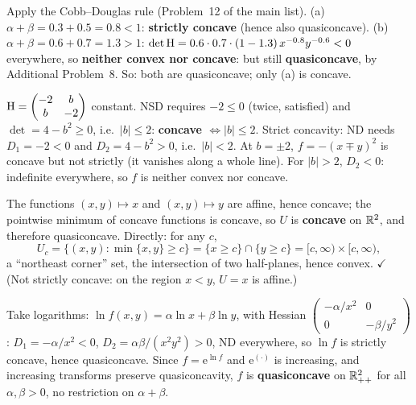 \begin{solutions}
  \item Apply the Cobb--Douglas rule (Problem~12 of the main list).
        (a) $\alpha+\beta=0.3+0.5=0.8<1$: \textbf{strictly concave}
        (hence also quasiconcave). \;
        (b) $\alpha+\beta=0.6+0.7=1.3>1$:
        $\det\operatorname{H}=0.6\cdot0.7\cdot(1-1.3)\,x^{-0.8}y^{-0.6}<0$
        everywhere, so \textbf{neither convex nor concave}: but still
        \textbf{quasiconcave}, by Additional Problem~8. So: both are
        quasiconcave; only (a) is concave.

  \item $\operatorname{H}=\begin{pmatrix}-2&b\\b&-2\end{pmatrix}$ constant. NSD
        requires $-2\le0$ (twice, satisfied) and
        $\det=4-b^{2}\ge0$, i.e.\ $|b|\le2$: \textbf{concave $\iff
        |b|\le2$}. Strict concavity: ND needs $D_1=-2<0$ and
        $D_2=4-b^{2}>0$, i.e.\ \textbf{$|b|<2$}. At $b=\pm2$,
        $f=-(x\mp y)^{2}$ is concave but not strictly (it vanishes along
        a whole line). For $|b|>2$, $D_2<0$: indefinite everywhere, so
        $f$ is neither convex nor concave.

  \item The functions $(x,y)\mapsto x$ and $(x,y)\mapsto y$ are affine,
        hence concave; the pointwise minimum of concave functions is
        concave, so $U$ is \textbf{concave} on $\mathbb{R}^{2}$, and therefore
        quasiconcave. Directly: for any $c$,
        \[
          U_c=\{(x,y): \min\{x,y\}\ge c\} = \{x\ge c\}\cap\{y\ge c\}
             = [c,\infty)\times[c,\infty),
        \]
        a ``northeast corner'' set, the intersection of two half-planes,
        hence convex. \; $\checkmark$ (Not strictly concave: on the region
        $x<y$, $U=x$ is affine.)

  \item Take logarithms: $\ln f(x,y)=\alpha\ln x+\beta\ln y$, with
        Hessian
        $\begin{pmatrix}-\alpha/x^{2}&0\\0&-\beta/y^{2}\end{pmatrix}$:
        $D_1=-\alpha/x^{2}<0$, $D_2=\alpha\beta/(x^{2}y^{2})>0$, ND
        everywhere, so $\ln f$ is strictly concave, hence quasiconcave.
        Since $f=\mathrm{e}^{\ln f}$ and $\mathrm{e}^{(\cdot)}$ is
        increasing, and increasing transforms preserve quasiconcavity,
        $f$ is \textbf{quasiconcave} on $\mathbb{R}^{2}_{++}$ for all
        $\alpha,\beta>0$, no restriction on $\alpha+\beta$.


\end{solutions}
